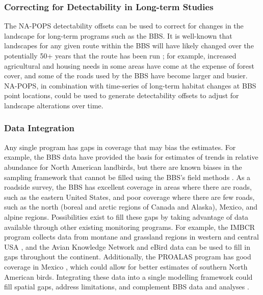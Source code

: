 \subsubsection{Correcting for Detectability in Long-term Studies}

\par The NA-POPS detectability offsets can be used to correct for changes in the landscape for long-term programs such as the BBS. It is well-known that landscapes for any given route within the BBS will have likely changed over the potentially 50+ years that the route has been run \citep{sauer_first_2017}; for example, increased agricultural and housing needs in some areas have come at the expense of forest cover, and some of the roads used by the BBS have become larger and busier. NA-POPS, in combination with time-series of long-term habitat changes at BBS point locations, could be used to generate detectability offsets to adjust for landscape alterations over time. 

\subsubsection{Data Integration}

\par Any single program has gaps in coverage that may bias the estimates. For example, the BBS data have provided the basis for estimates of trends in relative abundance for North American landbirds, but there are known biases in the sampling framework that cannot be filled using the BBS’s field methods \citep{thogmartin_sensitivity_2010, solymos_lessons_2020, us_geological_survey_strategic_2020}. As a roadside survey, the BBS has excellent coverage in areas where there are roads, such as the eastern United States, and poor coverage where there are few roads, such as the north (boreal and arctic regions of Canada and Alaska), Mexico, and alpine regions. Possibilities exist to fill these gaps by taking advantage of data available through other existing monitoring programs. For example, the IMBCR program collects data from montane and grassland regions in western and central USA \citep{pavlacky_statistically_2017}, and the Avian Knowledge Network \citep{iliff_avian_2009} and eBird data \citep{sullivan_ebird_2014} can be used to fill in gaps throughout the continent. Additionally, the PROALAS program has good coverage in Mexico \citep{ruiz_gutierrez_proalas_2020}, which could allow for better estimates of southern North American birds. Integrating these data into a single modelling framework could fill spatial gaps, address limitations, and complement BBS data and analyses \citep{miller_recent_2019, isaac_data_2020}.

